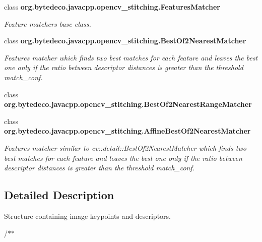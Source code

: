 \begin{DoxyCompactItemize}
class {\bfseries org.\+bytedeco.\+javacpp.\+opencv\+\_\+stitching.\+Features\+Matcher}
\begin{DoxyCompactList}\small\item\em Feature matchers base class. \end{DoxyCompactList}\item 
class {\bfseries org.\+bytedeco.\+javacpp.\+opencv\+\_\+stitching.\+Best\+Of2\+Nearest\+Matcher}
\begin{DoxyCompactList}\small\item\em Features matcher which finds two best matches for each feature and leaves the best one only if the ratio between descriptor distances is greater than the threshold match\+\_\+conf. \end{DoxyCompactList}\item 
class {\bfseries org.\+bytedeco.\+javacpp.\+opencv\+\_\+stitching.\+Best\+Of2\+Nearest\+Range\+Matcher}
\item 
class {\bfseries org.\+bytedeco.\+javacpp.\+opencv\+\_\+stitching.\+Affine\+Best\+Of2\+Nearest\+Matcher}
\begin{DoxyCompactList}\small\item\em Features matcher similar to cv\+::detail\+::\+Best\+Of2\+Nearest\+Matcher which finds two best matches for each feature and leaves the best one only if the ratio between descriptor distances is greater than the threshold match\+\_\+conf. \end{DoxyCompactList}\end{DoxyCompactItemize}


\subsection{Detailed Description}
Structure containing image keypoints and descriptors. 

/$\ast$$\ast$ 